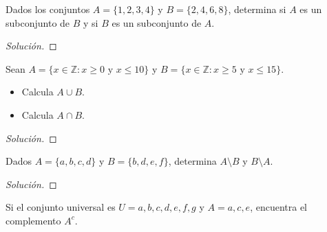\documentclass[a4,11pt]{aleph-notas}
\begin{document}
\encabezado

\begin{ejer}
    Dados los conjuntos $A = \{1, 2, 3, 4\}$ y $B = \{2, 4, 6, 8\}$, determina si $A$ es un subconjunto de $B$ y si $B$ es un subconjunto de $A$.
\end{ejer}

\begin{proof}[Solución]\hspace{0pt}
    
\end{proof}

\begin{ejer}
    Sean $A = \{x \in \mathbb{Z} : x \geq 0 \text{ y } x \leq 10\}$ y $B = \{x \in \mathbb{Z} : x \geq 5 \text{ y } x \leq 15\}$.
    \begin{itemize}
        \item Calcula $A \cup B$.
        \item Calcula $A \cap B$.
    \end{itemize}
\end{ejer}

\begin{proof}[Solución]\hspace{0pt}
    
\end{proof}

\begin{ejer}
    Dados $A = \{a, b, c, d\}$ y $B = \{b, d, e, f\}$, determina $A \setminus B$ y $B \setminus A$.
\end{ejer}

\begin{proof}[Solución]\hspace{0pt}
    
\end{proof}

\begin{ejer}
    Si el conjunto universal es $U = {a, b, c, d, e, f, g}$ y $A = {a, c, e}$, encuentra el complemento $A^c$.
\end{ejer}
\end{document}
